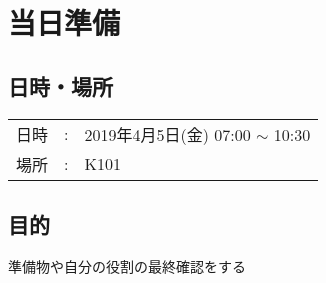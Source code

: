 
%
\section{当日準備}


\subsection{日時・場所}
\begin{tabular}{p{}rp{}}
  日時 & : & 2019年4月5日(金) 07:00 $\sim$ 10:30\\ %
  場所 & : & K101                                 %
\end{tabular}

\vspace{-5mm}
\subsection{目的}
準備物や自分の役割の最終確認をする

\vspace{-5mm}
